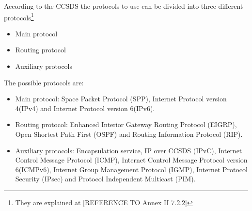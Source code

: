 According to the CCSDS the protocols to use can be divided into three different protocols\footnote{They are explained at [REFERENCE TO Annex II 7.2.2]} 
\begin{itemize}
\item Main protocol
\item Routing protocol
\item Auxiliary protocols
\end{itemize}
The possible protocols are:
\begin{itemize}
\item Main protocol: Space Packet Protocol (SPP), Internet Protocol version 4(IPv4) and Internet Protocol version 6(IPv6).
\item Routing protocol: Enhanced Interior Gateway Routing Protocol (EIGRP), Open Shortest Path First (OSPF) and Routing Information Protocol (RIP).
\item Auxiliary protocols: Encapsulation service, IP over CCSDS (IPvC), Internet Control Message Protocol (ICMP), Internet Control Message Protocol version 6(ICMPv6), Internet Group Management Protocol (IGMP), Internet Protocol Security (IPsec) and Protocol Independent Multicast (PIM).
\end{itemize}
